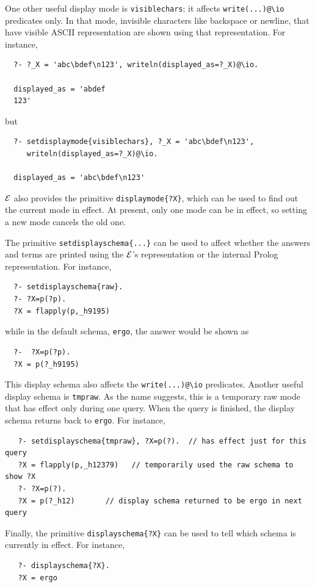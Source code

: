 \documentclass[11pt]{article}
\newcommand{\ERGO}{\mbox{\ensuremath{\cal{E}}\smaller{{\sc{RGO}}}}\xspace}
\newcommand{\FLSYSTEM}{\ERGO}
\newcommand{\bs}{\textbackslash}
\begin{document}
One other useful display mode is \texttt{visiblechars}; it
affects \texttt{write(...)@\bs{}io}
predicates only. In that mode,
invisible characters like backspace or newline, that have visible ASCII
representation are shown using that representation. For instance,
\begin{verbatim}
  ?- ?_X = 'abc\bdef\n123', writeln(displayed_as=?_X)@\io.

  displayed_as = 'abdef
  123'
\end{verbatim}
but
\begin{verbatim}
  ?- setdisplaymode{visiblechars}, ?_X = 'abc\bdef\n123',
     writeln(displayed_as=?_X)@\io.

  displayed_as = 'abc\bdef\n123'
\end{verbatim}

\FLSYSTEM also provides the
primitive \texttt{displaymode\{?X\}}, which can be used to find out the
current mode in effect. At present, only one mode can be in effect, so
setting a new mode cancels the old one.

The primitive \texttt{setdisplayschema\{...\}} can be used to affect
whether the answers and terms are printed using the \FLSYSTEM's
representation or the internal Prolog representation. For instance,
\begin{verbatim}
  ?- setdisplayschema{raw}.
  ?- ?X=p(?p).
  ?X = flapply(p,_h9195)
\end{verbatim}
while in the default schema, \texttt{ergo},
the answer would be shown as
\begin{verbatim}
  ?-  ?X=p(?p).
  ?X = p(?_h9195)
\end{verbatim}
This display schema also affects the \texttt{write(...)@\bs{}io} predicates. 
Another useful display schema is \texttt{tmpraw}. As the name suggests,
this is a temporary raw mode that has effect only during one query. When
the query is finished, the display schema returns back to
\texttt{ergo}. For instance,
\begin{verbatim}
   ?- setdisplayschema{tmpraw}, ?X=p(?).  // has effect just for this query
   ?X = flapply(p,_h12379)   // temporarily used the raw schema to show ?X
   ?- ?X=p(?).
   ?X = p(?_h12)       // display schema returned to be ergo in next query
\end{verbatim}

Finally, the primitive \texttt{displayschema\{?X\}} can be used to tell
which schema is currently in effect. 
For instance,
\begin{verbatim}
   ?- displayschema{?X}.
   ?X = ergo
\end{verbatim}
\end{document}
